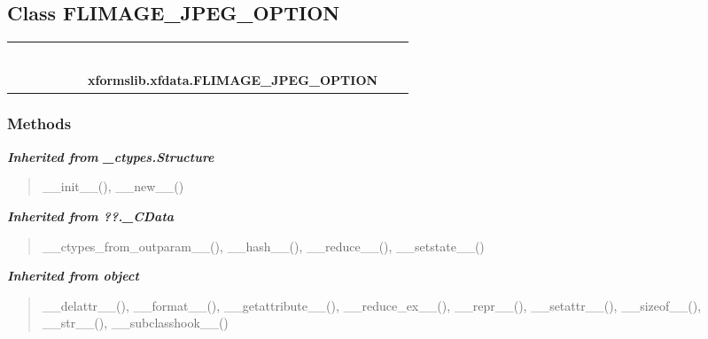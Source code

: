 \subsection{Class FLIMAGE\_JPEG\_OPTION}

    \label{xformslib:xfdata:FLIMAGE_JPEG_OPTION}
\begin{tabular}{cccccccccc}
\multicolumn{2}{r}{\settowidth{\BCL}{object}\multirow{2}{\BCL}{object}}
&&
&&
&&
  \\\cline{3-3}
  &&\multicolumn{1}{c|}{}
&&
&&
&&
  \\
\multicolumn{4}{r}{\settowidth{\BCL}{??.\_CData}\multirow{2}{\BCL}{??.\_CData}}
&&
&&
  \\\cline{5-5}
  &&&&\multicolumn{1}{c|}{}
&&
&&
  \\
\multicolumn{6}{r}{\settowidth{\BCL}{\_ctypes.Structure}\multirow{2}{\BCL}{\_ctypes.Structure}}
&&
  \\\cline{7-7}
  &&&&&&\multicolumn{1}{c|}{}
&&
  \\
&&&&&&\multicolumn{2}{l}{\textbf{xformslib.xfdata.FLIMAGE\_JPEG\_OPTION}}
\end{tabular}



  \subsubsection{Methods}


\large{\textbf{\textit{Inherited from \_ctypes.Structure}}}

\begin{quote}
\_\_init\_\_(), \_\_new\_\_()
\end{quote}

\large{\textbf{\textit{Inherited from ??.\_CData}}}

\begin{quote}
\_\_ctypes\_from\_outparam\_\_(), \_\_hash\_\_(), \_\_reduce\_\_(), \_\_setstate\_\_()
\end{quote}

\large{\textbf{\textit{Inherited from object}}}

\begin{quote}
\_\_delattr\_\_(), \_\_format\_\_(), \_\_getattribute\_\_(), \_\_reduce\_ex\_\_(), \_\_repr\_\_(), \_\_setattr\_\_(), \_\_sizeof\_\_(), \_\_str\_\_(), \_\_subclasshook\_\_()
\end{quote}

